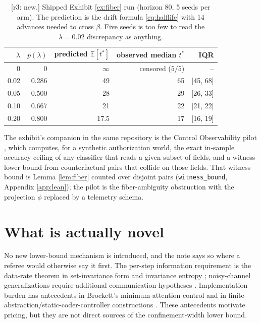 \documentclass[11pt]{article}
\theoremstyle{definition}
\theoremstyle{remark}
\newcommand{\revnote}[1]{\textcolor{red!60!black}{[r3: #1]}}
\begin{document}
\begin{table}[ht]
\centering
\small
\begin{tabular}{rrrrr}
\toprule
$\lambda$ & $p(\lambda)$ & predicted $\mathbb E[t^*]$ & observed median $t^*$ & IQR \\
\midrule
0 & 0 & $\infty$ & censored ($5/5$) & -- \\
0.02 & 0.286 & 49 & 65 & [45, 68] \\
0.05 & 0.500 & 28 & 29 & [26, 33] \\
0.10 & 0.667 & 21 & 22 & [21, 22] \\
0.20 & 0.800 & 17.5 & 17 & [16, 19] \\
\bottomrule
\end{tabular}
\caption{\revnote{new.} Shipped Exhibit \ref{ex:fiber} run (horizon 80, 5 seeds per arm). The prediction is the drift formula \eqref{eq:halflife} with 14 advances needed to cross $\beta$. Five seeds is too few to read the $\lambda=0.02$ discrepancy as anything.}
\label{tab:exhibit}
\end{table}

The exhibit's companion in the same repository is the Control Observability pilot \cite{dugan2026harness}, which computes, for a synthetic authorization world, the exact in-sample accuracy ceiling of any classifier that reads a given subset of fields, and a witness lower bound from counterfactual pairs that collide on those fields. That witness bound is Lemma \ref{lem:fiber} counted over disjoint pairs (\texttt{witness\_bound}, Appendix \ref{app:lean}); the pilot is the fiber-ambiguity obstruction with the projection $\phi$ replaced by a telemetry schema.

\section{What is actually novel}

No new lower-bound mechanism is introduced, and the note says so where a referee would otherwise say it first. The per-step information requirement is the data-rate theorem in set-invariance form and invariance entropy \cite{nair2000,colonius2009,kawan2013}; noisy-channel generalizations require additional communication hypotheses \cite{tatikonda2004,sahai2006}. Implementation burden has antecedents in Brockett's minimum-attention control and in finite-abstraction/static-coder-controller constructions \cite{brockett1997,lee2022,donkers2014,tomar2022}. These antecedents motivate pricing, but they are not direct sources of the confinement-width lower bound.
\end{document}
